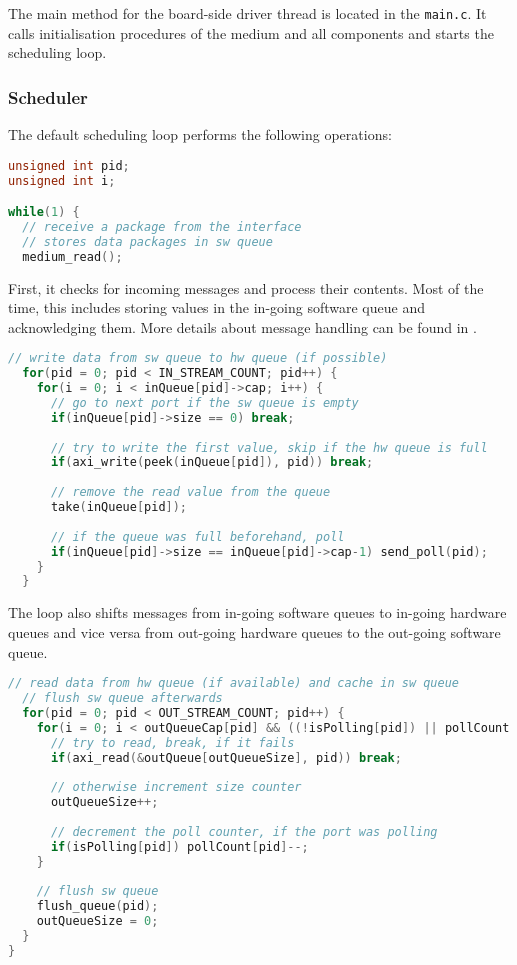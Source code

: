\documentclass{report}
\begin{document}
The main method for the board-side driver thread is located in the \texttt{main.c}. It calls initialisation procedures of the medium and all components and starts the scheduling loop.

\subsubsection{Scheduler}
The default scheduling loop performs the following operations:

\begin{lstlisting}[language=c, breaklines=true]
unsigned int pid;
unsigned int i;

while(1) {
  // receive a package from the interface
  // stores data packages in sw queue
  medium_read();
\end{lstlisting}

First, it checks for incoming messages and process their contents. Most of the time, this includes storing values in the in-going software queue and acknowledging them. More details about message handling can be found in .

\begin{lstlisting}[language=c, breaklines=true]
  // write data from sw queue to hw queue (if possible)
  for(pid = 0; pid < IN_STREAM_COUNT; pid++) {
    for(i = 0; i < inQueue[pid]->cap; i++) {
      // go to next port if the sw queue is empty
      if(inQueue[pid]->size == 0) break;
        
      // try to write the first value, skip if the hw queue is full
      if(axi_write(peek(inQueue[pid]), pid)) break;
        
      // remove the read value from the queue
      take(inQueue[pid]);
  
      // if the queue was full beforehand, poll
      if(inQueue[pid]->size == inQueue[pid]->cap-1) send_poll(pid);
    }
  }
\end{lstlisting}

The loop also shifts messages from in-going software queues to in-going hardware queues and vice versa from out-going hardware queues to the out-going software queue.

\begin{lstlisting}[language=c, breaklines=true]
  // read data from hw queue (if available) and cache in sw queue
  // flush sw queue afterwards
  for(pid = 0; pid < OUT_STREAM_COUNT; pid++) {
    for(i = 0; i < outQueueCap[pid] && ((!isPolling[pid]) || pollCount[pid] > 0); i++) {
      // try to read, break, if it fails
      if(axi_read(&outQueue[outQueueSize], pid)) break;
      
      // otherwise increment size counter
      outQueueSize++;
      
      // decrement the poll counter, if the port was polling
      if(isPolling[pid]) pollCount[pid]--;
    }
    
    // flush sw queue
    flush_queue(pid);
    outQueueSize = 0;
  }
}
\end{lstlisting}
\end{document}
